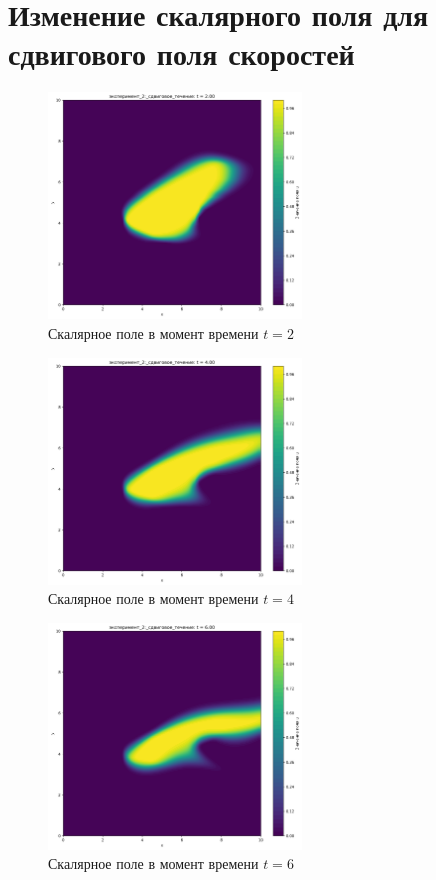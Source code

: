 \chapter{Изменение скалярного поля  для сдвигового поля скоростей}
\label{app:shear_df}

\begin{figure}[h]
	\centering
	\includegraphics[width=0.6\textwidth]{imgs/эксперимент_2:_сдвиговое_течение_t2.00.png}
	\caption{Скалярное поле в момент времени $t=2$ }
\end{figure}
\begin{figure}[h]
	\centering
	\includegraphics[width=0.6\textwidth]{imgs/эксперимент_2:_сдвиговое_течение_t4.00.png}
	\caption{Скалярное поле в момент времени $t=4$}
\end{figure}
\begin{figure}[h]
	\centering
	\includegraphics[width=0.6\textwidth]{imgs/эксперимент_2:_сдвиговое_течение_t6.00.png}
	\caption{Скалярное поле в момент времени $t=6$ }
\end{figure}
